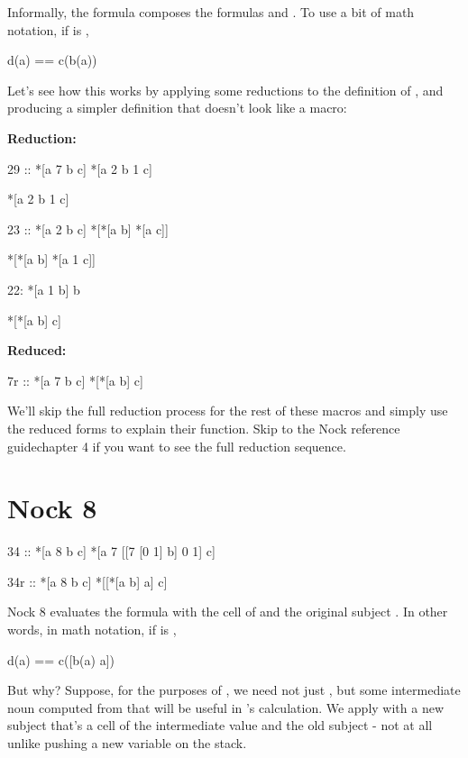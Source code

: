 Informally, the formula \kode{[7 b c]} composes the formulas  and
.  To use a bit of math notation, if  is \kode{[7 b c]},

\begin{code}
d(a) == c(b(a))
\end{code}
Let's see how this works by applying some reductions to the
definition of , and producing a simpler definition that
doesn't look like a macro:

\textbf{ Reduction:}

\begin{code}
29 ::    *[a 7 b c]        *[a 2 b 1 c]

*[a 2 b 1 c]

23 ::    *[a 2 b c]        *[*[a b] *[a c]] 

*[*[a b] *[a 1 c]]

22:    *[a 1 b]          b
 
*[*[a b] c]
\end{code}
\textbf{ Reduced:}

\begin{code}
7r ::     *[a 7 b c]         *[*[a b] c]
\end{code}
We'll skip the full reduction process for the rest of these macros and simply use the reduced forms to explain their function. Skip to the Nock reference guidechapter 4 if you want to see the full reduction sequence.

\section{Nock 8}

\begin{code}
34 ::    *[a 8 b c]       *[a 7 [[7 [0 1] b] 0 1] c]

34r ::    *[a 8 b c]       *[[*[a b] a] c]
\end{code}

Nock 8 evaluates the formula  with the cell of \kode{*[a b]} and the original
subject .  In other words, in math notation, if  is \kode{[8 b c]},

\begin{code}
d(a) == c([b(a) a])
\end{code}
But why?  Suppose, for the purposes of , we need not just ,
but some intermediate noun computed from  that will be useful
in 's calculation.  We apply  with a new subject that's a
cell of the intermediate value and the old subject - not at all
unlike pushing a new variable on the stack.

